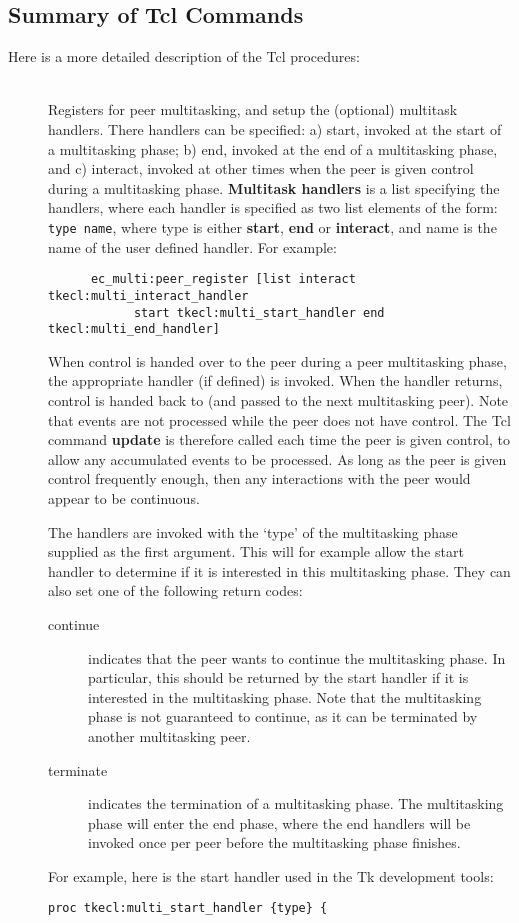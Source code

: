 \subsection{Summary of Tcl Commands}
Here is a more detailed description of the Tcl procedures:
\begin{description}
\item[] \ \\
       Registers for peer multitasking, and setup the (optional) multitask handlers.
       There handlers can be specified: a) start, invoked at the start of a
       multitasking phase; b) end, invoked at the end of a multitasking
       phase, and c) interact, invoked at other times when the peer is
       given control during a multitasking phase. {\bf Multitask handlers}
       is a list specifying the handlers, where each handler is specified
       as two list elements of the form: {\tt type name},
       where type is either {\bf start}, {\bf end} or {\bf interact}, and
       name is the name of the user defined handler. For example:
\begin{verbatim}
      ec_multi:peer_register [list interact tkecl:multi_interact_handler 
            start tkecl:multi_start_handler end tkecl:multi_end_handler]
\end{verbatim}
       When control is handed over to the peer during a peer multitasking
       phase, the appropriate handler (if defined) is invoked. When the
       handler returns, control is handed back to {\eclipse} (and passed
       to the next multitasking peer). Note 
       that events are not processed while the peer does not have control.
       The Tcl command {\bf update} is therefore called each time the peer
       is given control, to allow any accumulated events to be processed.
       As long as the peer
       is given control frequently enough, then any interactions with the
       peer would appear to be continuous.

       The handlers are invoked with the `type' of the multitasking phase
       supplied as the first  argument. This will for example allow the
       start handler to determine if it is interested in this multitasking
       phase. They can also set one of the following return codes:
\begin{description}
\item[continue] indicates that the peer wants to continue the multitasking
  phase. In  particular, this should be returned by the start handler if it is
  interested in the multitasking phase. Note that the multitasking phase is
  not guaranteed to continue, as it can be terminated by another
  multitasking peer.
\item[terminate] indicates the termination of a multitasking phase. The
  multitasking phase will enter the end phase, where the end handlers
  will be invoked once per peer before the multitasking phase finishes.
\end{description}
       For example, here is the start handler used in the Tk development
       tools:
\begin{verbatim}
proc tkecl:multi_start_handler {type} {


\end{verbatim}
\end{description}
